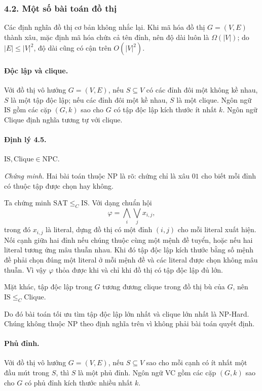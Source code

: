 \documentclass[11pt]{article}
\begin{document}
\subsubsection*{4.2. Một số bài toán đồ thị}

Các định nghĩa đồ thị cơ bản không nhắc lại. Khi mã hóa đồ thị \(G=(V,E)\) thành
xâu, mặc định mã hóa chứa cả tên đỉnh, nên độ dài luôn là \(\Omega(|V|)\); do
\(|E|\le |V|^2\), độ dài cũng có cận trên \(O(|V|^2)\).

\paragraph{Độc lập và clique.}
Với đồ thị vô hướng \(G=(V,E)\), nếu \(S\subseteq V\) có các đỉnh đôi một không
kề nhau, \(S\) là một tập độc lập; nếu các đỉnh đôi một kề nhau, \(S\) là một
clique. Ngôn ngữ IS gồm các cặp \((G,k)\) sao cho \(G\) có tập độc lập kích
thước ít nhất \(k\). Ngôn ngữ Clique định nghĩa tương tự với clique.

\paragraph{Định lý 4.5.}
\(\mathrm{IS},\mathrm{Clique}\in\mathrm{NPC}\).

\emph{Chứng minh.}
Hai bài toán thuộc NP là rõ: chứng chỉ là xâu \(01\) cho biết mỗi đỉnh có thuộc
tập được chọn hay không.

Ta chứng minh \(\mathrm{SAT}\le_C\mathrm{IS}\). Với dạng chuẩn hội
\[
  \varphi=\bigwedge_i\bigvee_j x_{i,j},
\]
trong đó \(x_{i,j}\) là literal, dựng đồ thị có một đỉnh \((i,j)\) cho mỗi
literal xuất hiện. Nối cạnh giữa hai đỉnh nếu chúng thuộc cùng một mệnh đề
tuyển, hoặc nếu hai literal tương ứng mâu thuẫn nhau. Khi đó tập độc lập kích
thước bằng số mệnh đề phải chọn đúng một literal ở mỗi mệnh đề và các literal
được chọn không mâu thuẫn. Vì vậy \(\varphi\) thỏa được khi và chỉ khi đồ thị
có tập độc lập đủ lớn.

Mặt khác, tập độc lập trong \(G\) tương đương clique trong đồ thị bù của \(G\),
nên \(\mathrm{IS}\le_C\mathrm{Clique}\).

Do đó bài toán tối ưu tìm tập độc lập lớn nhất và clique lớn nhất là NP-Hard.
Chúng không thuộc NP theo định nghĩa trên vì không phải bài toán quyết định.

\paragraph{Phủ đỉnh.}
Với đồ thị vô hướng \(G=(V,E)\), nếu \(S\subseteq V\) sao cho mỗi cạnh có ít
nhất một đầu mút trong \(S\), thì \(S\) là một phủ đỉnh. Ngôn ngữ VC gồm các cặp
\((G,k)\) sao cho \(G\) có phủ đỉnh kích thước nhiều nhất \(k\).
\end{document}
